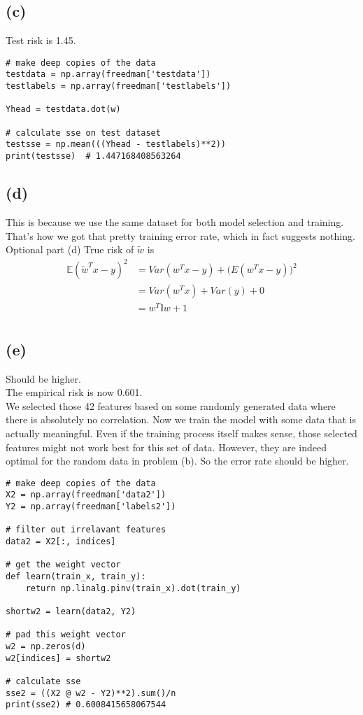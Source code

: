\documentclass[11pt]{article}
\begin{document}
\subsection*{(c)}
Test risk is 1.45.
\begin{verbatim}
# make deep copies of the data
testdata = np.array(freedman['testdata'])
testlabels = np.array(freedman['testlabels'])

Yhead = testdata.dot(w)

# calculate sse on test dataset
testsse = np.mean(((Yhead - testlabels)**2))
print(testsse)  # 1.447168408563264
\end{verbatim}

\subsection*{(d)}
This is because we use the same dataset for both model selection and training. That's how we got that pretty training error rate, which in fact suggests nothing.\\
Optional part (d)
True risk of $\widetilde{w}$ is
\begin{equation}
    \begin{split}
        \mathbb{E}(\widetilde w^T x-y)^2 &= Var(w^T x-y) + \mathbb({E}(w^T x-y))^2 \\
        &= Var(w^Tx) + Var(y) + 0 \\
        &= w^T \mathbb{I} w + 1 \\
    \end{split}
\end{equation}

\subsection*{(e)}
Should be higher. \\
The empirical risk is now 0.601. \\
We selected those 42 features based on some randomly generated data where there is absolutely no correlation. Now we train the model with some data that is actually meaningful. Even if the training process itself makes sense, those selected features might not work best for this set of data. However, they are indeed optimal for the random data in problem (b). So the error rate should be higher.

\begin{verbatim}
# make deep copies of the data
X2 = np.array(freedman['data2'])
Y2 = np.array(freedman['labels2'])

# filter out irrelavant features
data2 = X2[:, indices]

# get the weight vector
def learn(train_x, train_y):
    return np.linalg.pinv(train_x).dot(train_y)

shortw2 = learn(data2, Y2)

# pad this weight vector
w2 = np.zeros(d)
w2[indices] = shortw2

# calculate sse
sse2 = ((X2 @ w2 - Y2)**2).sum()/n
print(sse2) # 0.6008415658067544
\end{verbatim}
\end{document}
